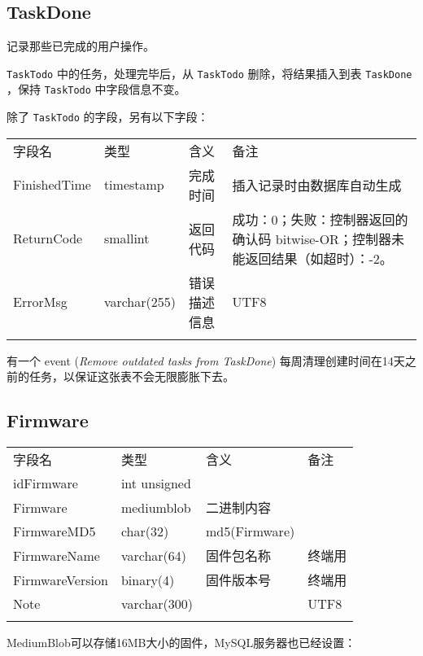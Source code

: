 \subsection{TaskDone}\label{taskdone}

记录那些已完成的用户操作。

\texttt{TaskTodo} 中的任务，处理完毕后，从 \texttt{TaskTodo}
删除，将结果插入到表 \texttt{TaskDone} ，保持 \texttt{TaskTodo}
中字段信息不变。

除了 \texttt{TaskTodo} 的字段，另有以下字段：

\begin{longtabu}[c]{@{}lXXX@{}}
\toprule\addlinespace
字段名 & 类型 & 含义 & 备注
\\\addlinespace
\midrule\endhead
FinishedTime & timestamp & 完成时间 & 插入记录时由数据库自动生成
\\\addlinespace
ReturnCode & smallint & 返回代码 & 成功：0；失败：控制器返回的确认码
bitwise-OR；控制器未能返回结果（如超时）：-2。
\\\addlinespace
ErrorMsg & varchar(255) & 错误描述信息 & UTF8
\\\addlinespace
\bottomrule
\end{longtabu}

有一个 event (\emph{Remove outdated tasks from TaskDone})
每周清理创建时间在14天之前的任务，以保证这张表不会无限膨胀下去。

\subsection{Firmware}\label{firmware}

\begin{longtabu}[c]{@{}lXXX@{}}
\toprule\addlinespace
字段名 & 类型 & 含义 & 备注
\\\addlinespace
\midrule\endhead
idFirmware & int unsigned & &
\\\addlinespace
Firmware & mediumblob & 二进制内容 &
\\\addlinespace
FirmwareMD5 & char(32) & md5(Firmware) &
\\\addlinespace
FirmwareName & varchar(64) & 固件包名称 & 终端用
\\\addlinespace
FirmwareVersion & binary(4) & 固件版本号 & 终端用
\\\addlinespace
Note & varchar(300) & & UTF8
\\\addlinespace
\bottomrule
\end{longtabu}

MediumBlob可以存储16MB大小的固件，MySQL服务器也已经设置：

